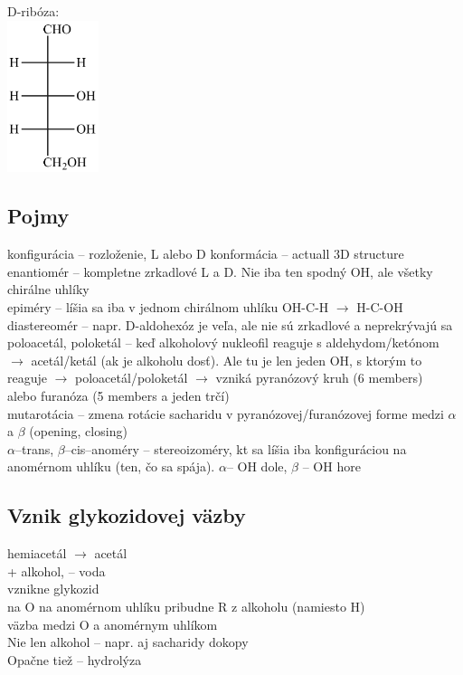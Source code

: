 \tab D-ribóza:\\
\includegraphics[width=0.2\textwidth]{images/ribose}\\
\subsection{Pojmy}
konfigurácia -- rozloženie, L alebo D
konformácia -- actuall 3D structure
enantiomér -- kompletne zrkadlové L a D. Nie iba ten spodný OH, ale všetky chirálne uhlíky\\
epiméry -- líšia sa iba v jednom chirálnom uhlíku OH-C-H $\rightarrow$ H-C-OH\\
diastereomér -- napr. D-aldohexóz je veľa, ale nie sú zrkadlové a neprekrývajú sa\\
poloacetál, poloketál -- keď alkoholový nukleofil reaguje s aldehydom/ketónom $\rightarrow$ acetál/ketál (ak je alkoholu dosť). Ale tu je len jeden OH, s ktorým to reaguje $\rightarrow$  poloacetál/poloketál $\rightarrow$ 
\tab vzniká pyranózový kruh (6 members)\\
\tab alebo furanóza (5 members a jeden trčí)\\
mutarotácia -- zmena rotácie sacharidu v pyranózovej/furanózovej forme medzi $\alpha$ a $\beta$ (opening, closing)\\
$\alpha$--trans, $\beta$--cis--anoméry -- stereoizoméry, kt sa líšia iba konfiguráciou na anomérnom uhlíku (ten, čo sa spája). $\alpha$-- OH dole, $\beta$ -- OH hore\\

\subsection{Vznik glykozidovej väzby}
hemiacetál $\rightarrow$ acetál\\
+ alkohol, -- voda\\
vznikne glykozid\\
na O na anomérnom uhlíku pribudne R z alkoholu (namiesto H)\\
väzba medzi O a anomérnym uhlíkom\\
Nie len alkohol -- napr. aj sacharidy dokopy\\
Opačne tiež -- hydrolýza\\
